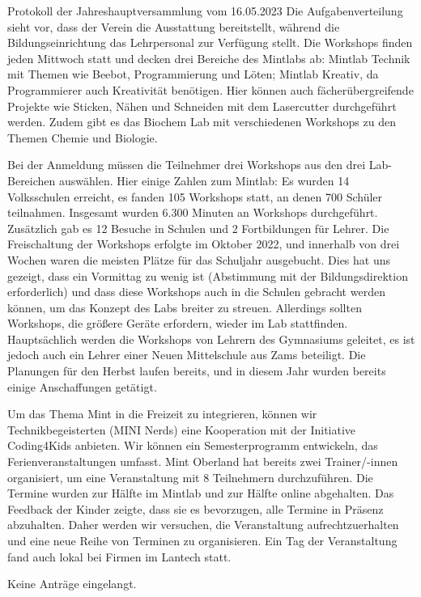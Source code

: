 \documentclass{scrartcl}
\begin{document}
\begin{Minutes}{Protokoll der Jahreshauptversammlung vom 16.05.2023}
  Die Aufgabenverteilung sieht vor, dass der Verein die Ausstattung bereitstellt, während die Bildungseinrichtung das Lehrpersonal zur Verfügung stellt. Die Workshops finden jeden Mittwoch statt und decken drei Bereiche des Mintlabs ab: Mintlab Technik mit Themen wie Beebot, Programmierung und Löten; Mintlab Kreativ, da Programmierer auch Kreativität benötigen. Hier können auch fächerübergreifende Projekte wie Sticken, Nähen und Schneiden mit dem Lasercutter durchgeführt werden. Zudem gibt es das Biochem Lab mit verschiedenen Workshops zu den Themen Chemie und Biologie.
  
  Bei der Anmeldung müssen die Teilnehmer drei Workshops aus den drei Lab-Bereichen auswählen. Hier einige Zahlen zum Mintlab: Es wurden 14 Volksschulen erreicht, es fanden 105 Workshops statt, an denen 700 Schüler teilnahmen. Insgesamt wurden 6.300 Minuten an Workshops durchgeführt. Zusätzlich gab es 12 Besuche in Schulen und 2 Fortbildungen für Lehrer. Die Freischaltung der Workshops erfolgte im Oktober 2022, und innerhalb von drei Wochen waren die meisten Plätze für das Schuljahr ausgebucht. Dies hat uns gezeigt, dass ein Vormittag zu wenig ist (Abstimmung mit der Bildungsdirektion erforderlich) und dass diese Workshops auch in die Schulen gebracht werden können, um das Konzept des Labs breiter zu streuen. Allerdings sollten Workshops, die größere Geräte erfordern, wieder im Lab stattfinden. Hauptsächlich werden die Workshops von Lehrern des Gymnasiums geleitet, es ist jedoch auch ein Lehrer einer Neuen Mittelschule aus Zams beteiligt. Die Planungen für den Herbst laufen bereits, und in diesem Jahr wurden bereits einige Anschaffungen getätigt.
  
  Um das Thema Mint in die Freizeit zu integrieren, können wir Technikbegeisterten (\glqq MINI Nerds\grqq{}) eine Kooperation mit der Initiative Coding4Kids anbieten. Wir können ein Semesterprogramm entwickeln, das Ferienveranstaltungen umfasst. Mint Oberland hat bereits zwei Trainer/-innen organisiert, um eine Veranstaltung mit 8 Teilnehmern durchzuführen. Die Termine wurden zur Hälfte im Mintlab und zur Hälfte online abgehalten. Das Feedback der Kinder zeigte, dass sie es bevorzugen, alle Termine in Präsenz abzuhalten. Daher werden wir versuchen, die Veranstaltung aufrechtzuerhalten und eine neue Reihe von Terminen zu organisieren. Ein Tag der Veranstaltung fand auch lokal bei Firmen im Lantech statt.

  Keine Anträge eingelangt.


\end{Minutes}
\end{document}
